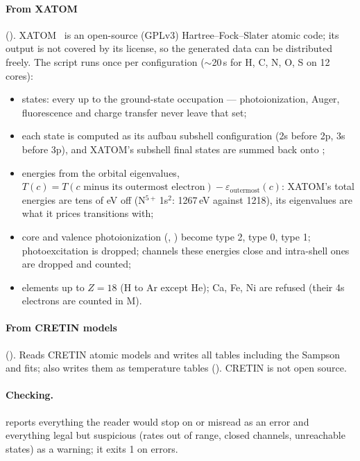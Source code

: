 \paragraph{From XATOM} ().
XATOM~\cite{jurek2016,son2011} is an open-source (GPLv3) Hartree--Fock--Slater atomic code; its output is not covered
by its license, so the generated data can be distributed freely.
The script runs  once per configuration ($\sim$20\,s for H, C, N, O, S on 12 cores):
\begin{itemize}
  \item states: every  up to the ground-state occupation --- photoionization, Auger, fluorescence and charge
    transfer never leave that set;
  \item each state is computed as its aufbau subshell configuration (2s before 2p, 3s before 3p), and XATOM's subshell
    final states are summed back onto ;
  \item energies from the orbital eigenvalues,
    $T(c) = T(c\text{ minus its outermost electron}) - \varepsilon_{\mathrm{outermost}}(c)$: XATOM's total energies are
    tens of eV off (N$^{5+}$\,1s$^2$: 1267\,eV against 1218), its eigenvalues are what it prices transitions with;
  \item core and valence photoionization (, ) become type 2,  type 0,  type 1;
    photoexcitation is dropped; channels these energies close and intra-shell ones are dropped and counted;
  \item elements up to $Z = 18$ (H to Ar except He); Ca, Fe, Ni are refused (their 4s electrons are
    counted in M).
\end{itemize}

\paragraph{From CRETIN models} ().
Reads CRETIN  atomic models and writes all tables including the Sampson and  fits;
 also writes them as temperature tables ().
CRETIN is not open source.

\paragraph{Checking.}
 reports everything the reader would stop on or
misread as an error and everything legal but suspicious (rates out of range, closed channels, unreachable states) as a
warning; it exits 1 on errors.

